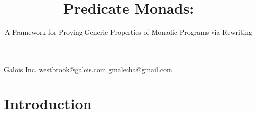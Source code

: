\documentclass[preprint]{sigplanconf}
\begin{document}




\setlength{\pdfpageheight}{\paperheight}
\setlength{\pdfpagewidth}{\paperwidth}






\title{Predicate Monads:}
\subtitle{A Framework for Proving Generic Properties of Monadic Programs via Rewriting}

           {Galois Inc.}
           {westbrook@galois.com}
           {}
           {gmalecha@gmail.com}

\maketitle








\section{Introduction}

\end{document}
